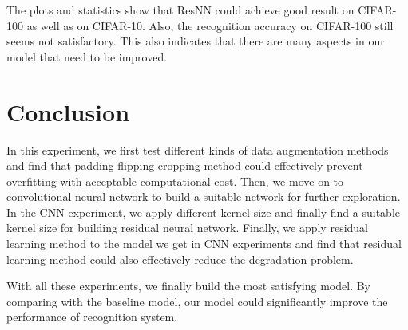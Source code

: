 \documentclass[]{article}
\begin{document}
The plots and statistics show that ResNN could achieve good result on CIFAR-100 as well as on CIFAR-10. Also, the recognition accuracy on CIFAR-100 still seems not satisfactory. This also indicates that there are many aspects in our model that need to be improved. 

\section{Conclusion}
In this experiment, we first test different kinds of data augmentation methods and find that padding-flipping-cropping method could effectively prevent overfitting with acceptable computational cost. Then, we move on to convolutional neural network to build a suitable network for further exploration. In the CNN experiment, we apply different kernel size and finally find a suitable kernel size for building residual neural network. Finally, we apply residual learning method to the model we get in CNN experiments and find that residual learning method could also effectively reduce the degradation problem.

With all these experiments, we finally build the most satisfying model. By comparing with the baseline model, our model could significantly improve the performance of recognition system.
\end{document}
